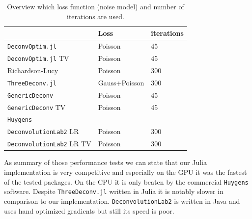\documentclass{juliacon}
\begin{document}
        \begin{table}[h]
            \begin{tabular}{l l l}
                & Loss & iterations \\ 
            \hline
            \verb|DeconvOptim.jl| & Poisson & 45 \\
            \verb|DeconvOptim.jl| TV & Poisson & 45\\
            Richardson-Lucy & Poisson & 300 \\
            \verb|ThreeDeconv.jl|  & Gauss+Poisson& 300\\
            \verb|GenericDeconv|  & Poisson & 45\\
            \verb|GenericDeconv| TV & Poisson & 45 \\
            \verb|Huygens| & & \\
            \verb|DeconvolutionLab2| LR & Poisson & 300\\
            \verb|DeconvolutionLab2| LR TV& Poisson & 300 
            \end{tabular}
            \caption{Overview which loss function (noise model) and number of iterations are used.}
            \label{tab:deconvprop}
        \end{table}
        As summary of those performance tests we can state that our Julia implementation is very competitive and especially on the GPU
        it was the fastest of the tested packages. On the CPU it is only beaten by the commercial \verb|Huygens| software. 
        Despite \verb|ThreeDeconv.jl| written in Julia it is notably slower in comparison to our implementation.
        \verb|DeconvolutionLab2| is written in Java and uses hand optimized gradients but still its speed is poor.
\end{document}
